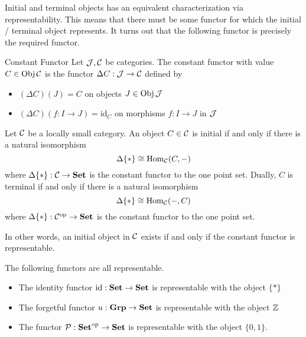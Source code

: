 \documentclass[a4paper]{article}
\begin{document}
Initial and terminal objects has an equivalent characterization via representability. This means that there must be some functor for which the initial / terminal object represents. It turns out that the following functor is precisely the required functor. 

\begin{defn}{Constant Functor}{} Let $\mathcal{J},\mathcal{C}$ be categories. The constant functor with value $C\in\operatorname{Obj}\mathcal{C}$ is the functor $\Delta C:\mathcal{J}\to\mathcal{C}$ defined by 
\begin{itemize}
\item $(\Delta C)(J)=C$ on objects $J\in\operatorname{Obj}\mathcal{J}$
\item $(\Delta C)(f:I\to J)=\text{id}_C$ on morphisms $f:I\to J$ in $\mathcal{J}$
\end{itemize}
\end{defn}

\begin{prp}{}{} Let $\mathcal{C}$ be a locally small category. An object $C\in\mathcal{C}$ is initial if and only if there is a natural isomorphism $$\Delta\{\ast\}\cong\operatorname{Hom}_{\mathcal{C}}(C,-)$$ where $\Delta\{\ast\}:\mathcal{C}\to\bold{Set}$ is the constant functor to the one point set. Dually, $C$ is terminal if and only if there is a natural isomorphism $$\Delta\{\ast\}\cong\operatorname{Hom}_{\mathcal{C}}(-,C)$$ where $\Delta\{\ast\}:\mathcal{C}^\text{op}\to\bold{Set}$ is the constant functor to the one point set. 
\end{prp}

In other words, an initial object in $\mathcal{C}$ exists if and only if the constant functor is representable. 

\begin{thm}{}{} The following functors are all representable. 
\begin{itemize}
\item The identity functor $\text{id}:\bold{Set}\to\bold{Set}$ is representable with the object $\{\ast\}$
\item The forgetful functor $u:\bold{Grp}\to\bold{Set}$ is representable with the object $\mathbb{Z}$
\item The functor $\mathcal{P}:\bold{Set}^\text{op}\to\bold{Set}$ is representable with the object $\{0,1\}$. 
\end{itemize}
\end{thm}
\end{document}
